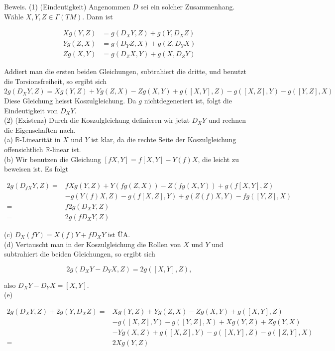 \documentclass[10pt]{article}
\begin{document}
Beweis. (1) (Eindeutigkeit) Angenommen $D$ sei ein solcher Zusammenhang. Wähle $X, Y, Z \in \Gamma(T M)$. Dann ist

$$
\begin{aligned}
X g(Y, Z) & =g\left(D_{X} Y, Z\right)+g\left(Y, D_{X} Z\right) \\
Y g(Z, X) & =g\left(D_{Y} Z, X\right)+g\left(Z, D_{Y} X\right) \\
Z g(X, Y) & =g\left(D_{Z} X, Y\right)+g\left(X, D_{Z} Y\right)
\end{aligned}
$$

Addiert man die ersten beiden Gleichungen, subtrahiert die dritte, und benutzt die Torsionsfreiheit, so ergibt sich\\
$2 g\left(D_{X} Y, Z\right)=X g(Y, Z)+Y g(Z, X)-Z g(X, Y)+g([X, Y], Z)-g([X, Z], Y)-g([Y, Z], X)$\\
Diese Gleichung heisst Koszulgleichung. Da $g$ nichtdegeneriert ist, folgt die Eindeutigkeit von $D_{X} Y$.\\
(2) (Existenz) Durch die Koszulgleichung definieren wir jetzt $D_{X} Y$ und rechnen die Eigenschaften nach.\\
(a) $\mathbb{R}$-Linearität in $X$ und $Y$ ist klar, da die rechte Seite der Koszulgleichung offensichtlich $\mathbb{R}$-linear ist.\\
(b) Wir benutzen die Gleichung $[f X, Y]=f[X, Y]-Y(f) X$, die leicht zu beweisen ist. Es folgt

$$
\begin{aligned}
2 g\left(D_{f X} Y, Z\right)= & f X g(Y, Z)+Y(f g(Z, X))-Z(f g(X, Y))+g(f[X, Y], Z) \\
& -g(Y(f) X, Z)-g(f[X, Z], Y)+g(Z(f) X, Y)-f g([Y, Z], X) \\
= & f 2 g\left(D_{X} Y, Z\right) \\
= & 2 g\left(f D_{X} Y, Z\right)
\end{aligned}
$$

(c) $D_{X}(f Y)=X(f) Y+f D_{X} Y$ ist ÜA.\\
(d) Vertauscht man in der Koszulgleichung die Rollen von $X$ und $Y$ und subtrahiert die beiden Gleichungen, so ergibt sich

$$
2 g\left(D_{X} Y-D_{Y} X, Z\right)=2 g([X, Y], Z),
$$

also $D_{X} Y-D_{Y} X=[X, Y]$.\\
(e)

$$
\begin{aligned}
2 g\left(D_{X} Y, Z\right)+2 g\left(Y, D_{X} Z\right)= & X g(Y, Z)+Y g(Z, X)-Z g(X, Y)+g([X, Y], Z) \\
& -g([X, Z], Y)-g([Y, Z], X)+X g(Y, Z)+Z g(Y, X) \\
& -Y g(X, Z)+g([X, Z], Y)-g([X, Y], Z)-g([Z, Y], X) \\
= & 2 X g(Y, Z)
\end{aligned}
$$
\end{document}
